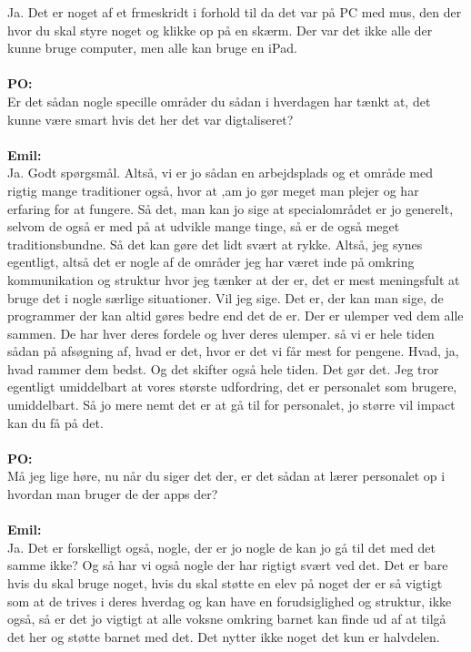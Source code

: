 Ja.
Det er noget af et frmeskridt i forhold til da det var på PC med mus, den der hvor du skal styre noget og klikke op på en skærm.
Der var det ikke alle der kunne bruge computer, men alle kan bruge en iPad.
\\\\
\textbf{PO:} \\
Er det sådan nogle specille områder du sådan i hverdagen har tænkt at, det kunne være smart hvis det her det var digtaliseret?
\\\\
\textbf{Emil:}\\
Ja. 
Godt spørgsmål.
Altså, vi er jo sådan en arbejdsplads og et område med rigtig mange traditioner også, hvor at ,am jo gør meget man plejer og har erfaring for at fungere. 
Så det, man kan jo sige at specialområdet er jo generelt, selvom de også er med på at udvikle mange tinge, så er de også meget traditionsbundne. 
Så det kan gøre det lidt svært at rykke.
Altså, jeg synes egentligt, altså det er nogle af de områder jeg har været inde på omkring kommunikation og struktur hvor jeg tænker at der er, det er mest meningsfult at bruge det i nogle særlige situationer.
Vil jeg sige.
Det er, der kan man sige, de programmer der kan altid gøres bedre end det de er. 
Der er ulemper ved dem alle sammen. 
De har hver deres fordele og hver deres ulemper.
så vi er hele tiden sådan på afsøgning af, hvad er det, hvor er det vi får mest for pengene.
Hvad, ja, hvad rammer dem bedst.
Og det skifter også hele tiden.
Det gør det.
Jeg tror egentligt umiddelbart at vores største udfordring, det er personalet som brugere, umiddelbart.
Så jo mere nemt det er at gå til for personalet, jo større vil impact kan du få på det.
\\\\
\textbf{PO:}\\
Må jeg lige høre, nu når du siger det der, er det sådan at lærer personalet op i hvordan man bruger de der apps der?
\\\\
\textbf{Emil:}\\
Ja.
Det er forskelligt også, nogle, der er jo nogle de kan jo gå til det med det samme ikke? 
Og så har vi også nogle der har rigtigt svært ved det.
Det er bare hvis du skal bruge noget, hvis du skal støtte en elev på noget der er så vigtigt som at de trives i deres hverdag og kan have en forudsiglighed og struktur, ikke også, så er det jo vigtigt at alle voksne omkring barnet kan finde ud af at tilgå det her og støtte barnet med det.
Det nytter ikke noget det kun er halvdelen.
